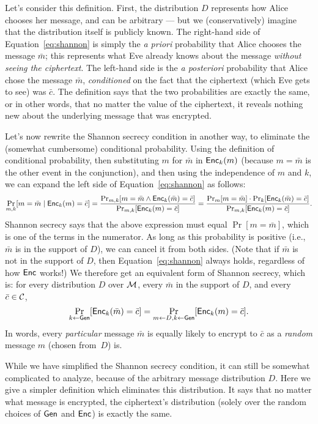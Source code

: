\documentclass[11pt]{article}
\begin{document}
Let's consider this definition.  First, the distribution $D$
represents how Alice chooses her message, and can be arbitrary --- but
we (conservatively) imagine that the distribution itself is publicly
known.  The right-hand side of Equation~\eqref{eq:shannon} is simply
the \textit{a priori} probability that Alice chooses the message
$\bar{m}$; this represents what Eve already knows about the message
\emph{without seeing the ciphertext}.  The left-hand side is the
\textit{a posteriori} probability that Alice chose the message
$\bar{m}$, \emph{conditioned} on the fact that the ciphertext (which
Eve gets to see) was $\bar{c}$.  The definition says that the two
probabilities are exactly the same, or in other words, that no matter
the value of the ciphertext, it reveals nothing new about the
underlying message that was encrypted.

Let's now rewrite the Shannon secrecy condition in another way, to
eliminate the (somewhat cumbersome) conditional probability.  Using
the definition of conditional probability, then substituting $m$ for
$\bar{m}$ in $\mathsf{Enc}_{k}(m)$ (because $m=\bar{m}$ is the other event
in the conjunction), and then using the independence of $m$ and $k$,
we can expand the left side of Equation~\eqref{eq:shannon} as follows:
\[ \Pr_{m,k}[m=\bar{m}\; |\; \mathsf{Enc}_{k}(m)=\bar{c}] =
\frac{\Pr_{m,k}[m = \bar{m} \wedge
  \mathsf{Enc}_{k}(\bar{m})=\bar{c}]}{\Pr_{m,k}[\mathsf{Enc}_{k}(m)=\bar{c}]} =
\frac{\Pr_{m}[m=\bar{m}] \cdot
  \Pr_{k}[\mathsf{Enc}_{k}(\bar{m})=\bar{c}]}{\Pr_{m,k}[\mathsf{Enc}_{k}(m)=\bar{c}]}. \]
Shannon secrecy says that the above expression must equal
$\Pr[m=\bar{m}]$, which is one of the terms in the numerator.  As long
as this probability is positive (i.e., $\bar{m}$ is in the support of
$D$), we can cancel it from both sides.  (Note that if $\bar{m}$ is
not in the support of $D$, then Equation~\eqref{eq:shannon} always
holds, regardless of how $\mathsf{Enc}$ works!)  We therefore get an
equivalent form of Shannon secrecy, which is: for every distribution
$D$ over $\mathcal{M}$, every $\bar{m}$ in the support of $D$, and every
$\bar{c} \in \mathcal{C}$, \[ \Pr_{k \gets
  \mathsf{Gen}}[\mathsf{Enc}_{k}(\bar{m})=\bar{c}] = \Pr_{m \gets D,k \gets
  \mathsf{Gen}}[\mathsf{Enc}_{k}(m)=\bar{c}]. \] In words, every
\emph{particular} message $\bar{m}$ is equally likely to encrypt to
$\bar{c}$ as a \emph{random} message $m$ (chosen from~$D$) is.

While we have simplified the Shannon secrecy condition, it can still
be somewhat complicated to analyze, because of the arbitrary message
distribution $D$.  Here we give a simpler definition which eliminates
this distribution.  It says that no matter what message is encrypted,
the ciphertext's distribution (solely over the random choices of
$\mathsf{Gen}$ and $\mathsf{Enc}$) is exactly the same.
\end{document}
